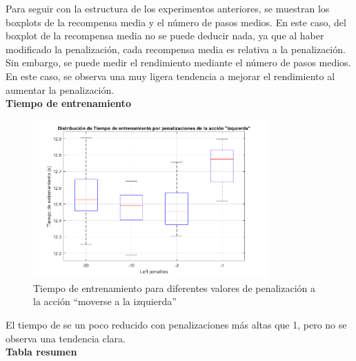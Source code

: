 Para seguir con la estructura de los experimentos anteriores, se muestran los boxplots de la recompensa media y el número de pasos medios. En este caso, del boxplot de la recompensa media no se puede deducir nada, ya que al haber modificado la penalización, cada recompensa media es relativa a la penalización. Sin embargo, se puede medir el rendimiento mediante el número de pasos medios. En este caso, se observa una muy ligera tendencia a mejorar el rendimiento al aumentar la penalización. 
\\

\textbf{Tiempo de entrenamiento}

\begin{figure}[H]
    \centering
    \includegraphics[width=0.8\textwidth]{../../experiments/qlearning/experiment-5/results/time.png}
    \caption{Tiempo de entrenamiento para diferentes valores de penalización a la acción ``moverse a la izquierda''}
    \label{fig:qlearning-time}
\end{figure}

El tiempo de se un poco reducido con penalizaciones más altas que 1, pero no se observa una tendencia clara. 
\\

\newpage
\textbf{Tabla resumen}

